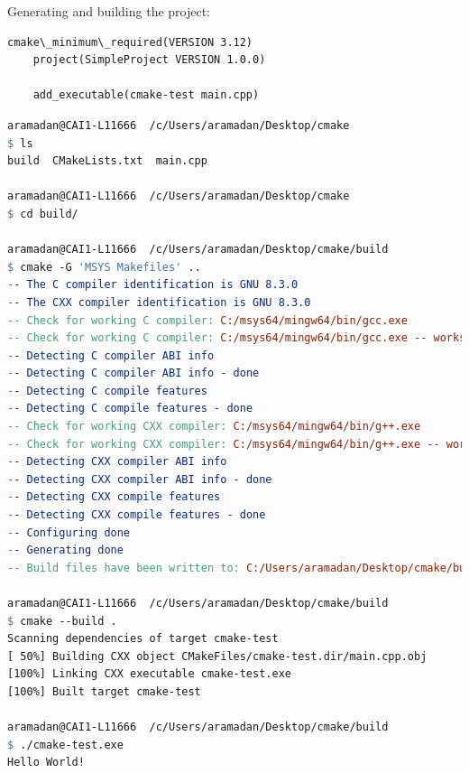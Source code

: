 \documentclass{article}
\begin{document}
Generating and building the project:
\begin{lstlisting}[language=make, caption=Simple cmake script]
    cmake\_minimum\_required(VERSION 3.12)
    project(SimpleProject VERSION 1.0.0)
    
    add_executable(cmake-test main.cpp)
\end{lstlisting}

\begin{lstlisting}[language=make, caption=Building a simple cmake]
aramadan@CAI1-L11666  /c/Users/aramadan/Desktop/cmake
$ ls
build  CMakeLists.txt  main.cpp
    
aramadan@CAI1-L11666  /c/Users/aramadan/Desktop/cmake
$ cd build/

aramadan@CAI1-L11666  /c/Users/aramadan/Desktop/cmake/build
$ cmake -G 'MSYS Makefiles' ..
-- The C compiler identification is GNU 8.3.0
-- The CXX compiler identification is GNU 8.3.0
-- Check for working C compiler: C:/msys64/mingw64/bin/gcc.exe
-- Check for working C compiler: C:/msys64/mingw64/bin/gcc.exe -- works
-- Detecting C compiler ABI info
-- Detecting C compiler ABI info - done
-- Detecting C compile features
-- Detecting C compile features - done
-- Check for working CXX compiler: C:/msys64/mingw64/bin/g++.exe
-- Check for working CXX compiler: C:/msys64/mingw64/bin/g++.exe -- works
-- Detecting CXX compiler ABI info
-- Detecting CXX compiler ABI info - done
-- Detecting CXX compile features
-- Detecting CXX compile features - done
-- Configuring done
-- Generating done
-- Build files have been written to: C:/Users/aramadan/Desktop/cmake/build

aramadan@CAI1-L11666  /c/Users/aramadan/Desktop/cmake/build
$ cmake --build .
Scanning dependencies of target cmake-test
[ 50%] Building CXX object CMakeFiles/cmake-test.dir/main.cpp.obj
[100%] Linking CXX executable cmake-test.exe
[100%] Built target cmake-test

aramadan@CAI1-L11666  /c/Users/aramadan/Desktop/cmake/build
$ ./cmake-test.exe
Hello World!
\end{lstlisting}
\end{document}
